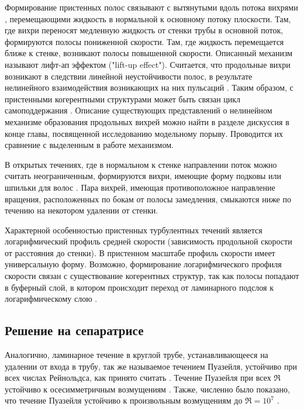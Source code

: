 Формирование пристенных полос связывают с вытянутыми вдоль потока вихрями \cite{Blackwelder1979, Jeong1997}, перемещающими жидкость в нормальной к основному потоку плоскости. Там, где вихри переносят медленную жидкость от стенки трубы в основной поток, формируются полосы пониженной скорости. Там, где жидкость перемещается ближе к стенке, возникают полосы повышенной скорости. Описанный механизм называют лифт-ап эффектом ("lift-up effect"). Считается, что продольные вихри возникают в следствии линейной неустойчивости полос, в результате нелинейного взаимодействия возникающих на них пульсаций \cite{Hamilton1995, Schoppa2002, Kawahara2003}. Таким образом, с пристенными когерентными структурами может быть связан цикл самоподдержания \cite{Hamilton1995, Waleffe1997}. Описание существующих представлений о нелинейном механизме образования продольных вихрей можно найти в разделе дискуссия в конце главы, посвященной исследованию модельному порыву. Проводится их сравнение с выделенным в работе механизмом.   

В открытых течениях, где в нормальном к стенке направлении поток можно считать неограниченным, формируются вихри, имеющие форму подковы или шпильки для волос \cite{Head1981, Robinson1991, Adrian2000, Adrian2007}. Пара вихрей, имеющая противоположное направление вращения, расположенных по бокам от полосы замедления, смыкаются ниже по течению на некотором удалении от стенки. 

Характерной особенностью пристенных турбулентных течений является логарифмический профиль средней скорости (зависимость продольной скорости от расстояния до стенки). В пристенном масштабе профиль скорости имеет универсальную форму. Возможно, формирование логарифмического профиля скорости связан с существование когерентных структур, так как полосы попадают в буферный слой, в котором происходит переход от ламинарного подслоя к логарифмическому слою \cite{}. 


	\subsection{Решение на сепаратрисе}

Аналогично, ламинарное течение в круглой трубе, устанавливающееся на удалении от входа в трубу, так же называемое течением Пуазейля, устойчиво при всех числах Рейнольдса, как принято считать \cite{Kerswell2005}. Течение Пуазейля при всех $\Re$ устойчиво к осесимметричным возмущениям \cite{Salwen1980}. Также, численно было показано, что течение Пуазейля устойчиво к произвольным возмущениям до $\Re = 10^7$ \cite{Meseguer2003}. 

